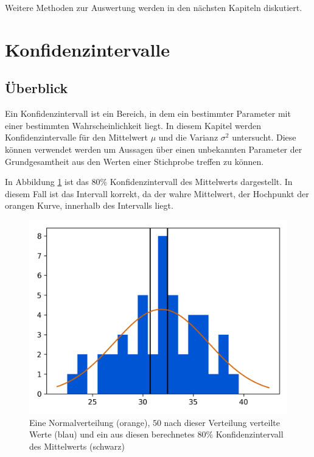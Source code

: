 \documentclass[10pt,twocolumn]{scrartcl}
\begin{document}
		Weitere Methoden zur Auswertung werden in den nächsten Kapiteln diskutiert.

\section{Konfidenzintervalle}
	\subsection{Überblick}
		Ein Konfidenzintervall ist ein Bereich, in dem ein bestimmter Parameter mit einer bestimmten Wahrscheinlichkeit liegt. In diesem Kapitel werden Konfidenzintervalle für den Mittelwert $\mu$ und die Varianz $\sigma^2$ untersucht. Diese können verwendet werden um Aussagen über einen unbekannten Parameter der Grundgesamtheit aus den Werten einer Stichprobe treffen zu können.

		In Abbildung \ref{fig_mean_interval_hist} ist das $80\%$ Konfidenzintervall des Mittelwerts dargestellt. In diesem Fall ist das Intervall korrekt, da der wahre Mittelwert, der Hochpunkt der orangen Kurve, innerhalb des Intervalls liegt.
		\begin{figure}[h]%
			\centering
			\includegraphics[width=0.9\columnwidth]{images/histogram_50_interval_1.png}
			\caption{Eine Normalverteilung (orange), $50$ nach dieser Verteilung verteilte Werte (blau) und ein aus diesen berechnetes $80\%$ Konfidenzintervall des Mittelwerts (schwarz)}
			\label{fig_mean_interval_hist}
		\end{figure}
\end{document}
